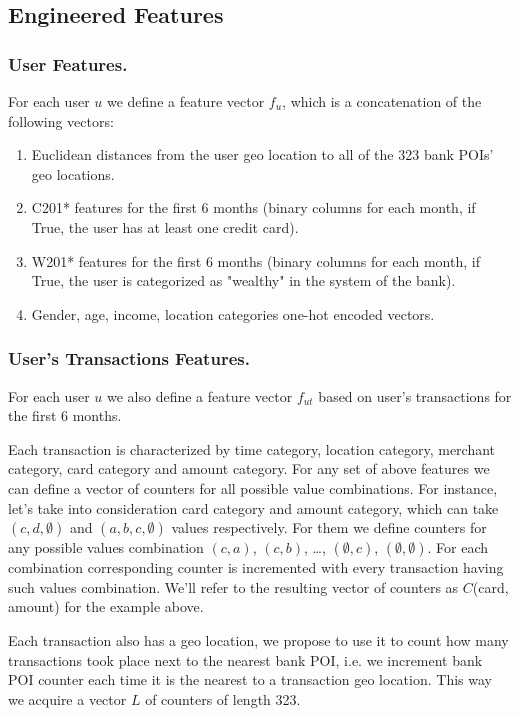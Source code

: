 \documentclass{llncs}
\begin{document}
	\subsection{Engineered Features} \label{features_1_section}
	
	\subsubsection{User Features.}
	
	For each user $u$ we define a feature vector $f_u$, which is a concatenation of the following vectors:
	\begin{enumerate}
		\item Euclidean distances from the user geo location to all of the 323 bank POIs' geo locations.
		\item C201* features for the first 6 months (binary columns for each month, if True, the user has at least one credit card).
		\item W201* features for the first 6 months (binary columns for each month, if True, the user is categorized as "wealthy" in the system of the bank).
		\item Gender, age, income, location categories one-hot encoded vectors.
	\end{enumerate}
	
	\subsubsection{User's Transactions Features.}
	For each user $u$ we also define a feature vector $f_{ut}$ based on user's transactions for the first 6 months.
	
	Each transaction is characterized by time category, location category, merchant category, card category and amount category. For any set of above features we can define a vector of counters \cite{mscounts} for all possible value combinations. For instance, let's take into consideration card category and amount category, which can take $(c, d, \emptyset)$ and $(a, b, c, \emptyset)$ values respectively. For them we define counters for any possible values combination $(c, a)$, $(c, b)$, \dots, $(\emptyset, c)$, $(\emptyset, \emptyset)$. For each combination corresponding counter is incremented with every transaction having such values combination. We'll refer to the resulting vector of counters as $C$(card, amount) for the example above.
	
	Each transaction also has a geo location, we propose to use it to count how many transactions took place next to the nearest bank POI, i.e. we increment bank POI counter each time it is the nearest to a transaction geo location. This way we acquire a vector $L$ of counters of length 323.
	
\end{document}
